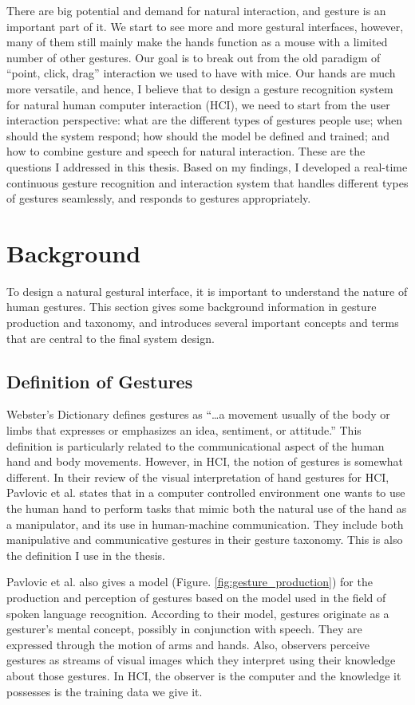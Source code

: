 There are big potential and demand for natural interaction, and gesture is
an important part of it. We start to see more and more gestural interfaces,
however, many of them still mainly make the hands function as a mouse with a
limited number of other gestures. Our goal is to break out from the old
paradigm of ``point, click, drag'' interaction we used to have with mice. 
Our hands are much more versatile, and hence, I believe that to design a gesture
recognition system for natural human computer interaction (HCI), we need to
start from the user interaction perspective: what are the different types of
gestures people use; when should the system respond; how should the model be
defined and trained; and how to combine gesture and speech for natural
interaction. These are the questions I addressed in this thesis. Based on my
findings, I developed a real-time continuous gesture recognition and
interaction system that handles different types of gestures seamlessly, and
responds to gestures appropriately.

\section{Background}
To design a natural gestural interface, it is important to understand the
nature of human gestures. This section gives some background information in
gesture production and taxonomy, and introduces several important concepts and
terms that are central to the final system design.
 
\subsection{Definition of Gestures}
Webster's Dictionary defines gestures as ``\ldots a movement usually of the body or limbs
that expresses or emphasizes an idea, sentiment, or attitude.'' This definition
is particularly related to the communicational aspect of the human hand and body
movements. However, in HCI, the notion
of gestures is somewhat different. In their review of the visual interpretation
of hand gestures for HCI, Pavlovic et al. \cite{Pavlovic97} states that in a computer
controlled environment one wants to use the human hand to perform tasks that
mimic both the natural use of the hand as a manipulator, and its use in
human-machine communication. They include both manipulative and communicative
gestures in their gesture taxonomy. This is also the definition I use in
the thesis.

Pavlovic et al. \cite{Pavlovic97} also gives a model (Figure. 
\ref{fig:gesture_production}) for the production and perception of gestures 
based on the model used in the field of spoken language recognition. According 
to their model, gestures originate as a gesturer's mental concept, possibly in 
conjunction with speech. They are expressed through the motion of arms and 
hands. Also, observers perceive gestures as streams of visual images which they
interpret using their knowledge about those gestures. In HCI, the 
observer is the computer and the knowledge it possesses is the training data we 
give it.

